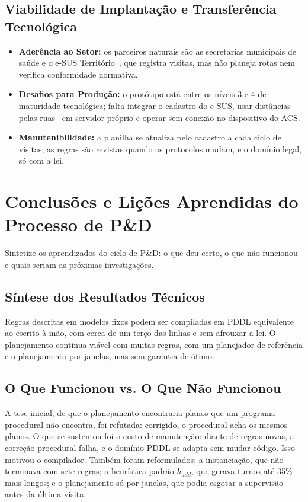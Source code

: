 \documentclass[11pt,a4paper]{article}
\begin{document}
\subsection{Viabilidade de Implantação e Transferência Tecnológica}
\begin{itemize}
    \item \textbf{Aderência ao Setor:} os parceiros naturais são as secretarias municipais de saúde e o e-SUS Território~\cite{esus}, que registra visitas, mas não planeja rotas nem verifica conformidade normativa.
    \item \textbf{Desafios para Produção:} o protótipo está entre os níveis 3 e 4 de maturidade tecnológica; falta integrar o cadastro do e-SUS, usar distâncias pelas ruas~\cite{osrm} em servidor próprio e operar sem conexão no dispositivo do ACS.
    \item \textbf{Manutenibilidade:} a planilha se atualiza pelo cadastro a cada ciclo de visitas, as regras são revistas quando os protocolos mudam, e o domínio legal, só com a lei.
\end{itemize}

\section{Conclusões e Lições Aprendidas do Processo de P\&D}

\begin{instrucao}
Sintetize os aprendizados do ciclo de P\&D: o que deu certo, o que não funcionou e quais seriam as próximas investigações.
\end{instrucao}

\subsection{Síntese dos Resultados Técnicos}
Regras descritas em modelos fixos podem ser compiladas em PDDL equivalente ao escrito à mão, com cerca de um terço das linhas e sem afrouxar a lei. O planejamento continua viável com muitas regras, com um planejador de referência e o planejamento por janelas, mas sem garantia de ótimo.

\subsection{O Que Funcionou vs. O Que Não Funcionou}
A tese inicial, de que o planejamento encontraria planos que um programa procedural não encontra, foi refutada: corrigido, o procedural acha os mesmos planos. O que se sustentou foi o custo de manutenção: diante de regras novas, a correção procedural falha, e o domínio PDDL se adapta sem mudar código. Isso motivou o compilador. Também foram reformulados: a instanciação, que não terminava com sete regras; a heurística padrão $h_{add}$, que gerava turnos até 35\% mais longos; e o planejamento só por janelas, que podia esgotar a supervisão antes da última visita.
\end{document}
